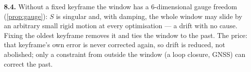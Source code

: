 \textbf{8.4.} Without a fixed keyframe the window has a 6-dimensional
gauge freedom (\cref{prop:gauge}): $S$ is singular and, with damping,
the whole window may slide by an arbitrary small rigid motion at every
optimisation --- a drift with no cause. Fixing the oldest keyframe
removes it and ties the window to the past. The price: that keyframe's
own error is never corrected again, so drift is reduced, not abolished;
only a constraint from outside the window (a loop closure, GNSS) can
correct the past.
